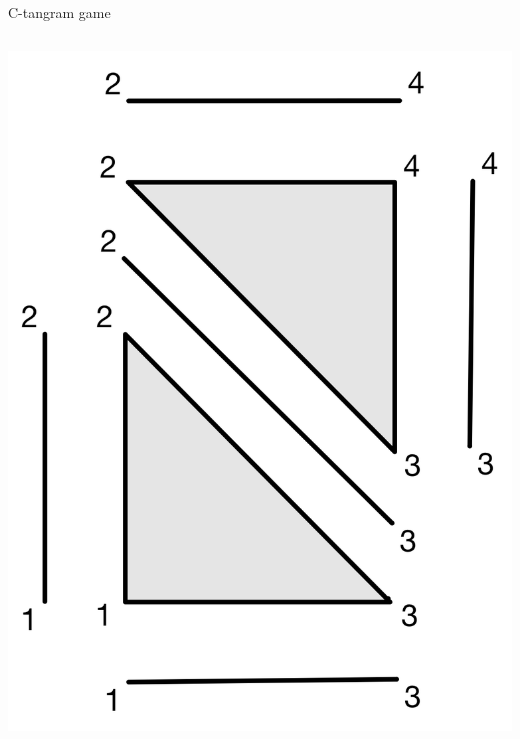 \documentclass{beamer}
\begin{document}
\begin{frame}{C-tangram game}
\begin{columns}
\begin{column}{0.5\textwidth}
\begin{center}
     \includegraphics[scale=0.14]{images/Pieces.png}
     \end{center}
\end{column}
\end{columns}
\end{frame}
\end{document}
